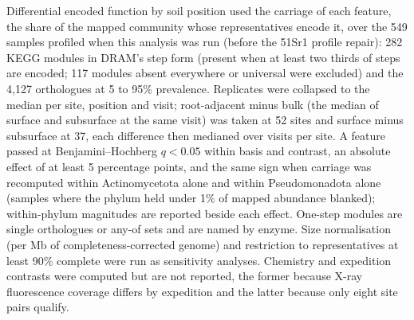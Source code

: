Differential encoded function by soil position used the carriage of each feature, the share of the
mapped community whose representatives encode it, over the 549 samples profiled when this analysis was run (before the 51Sr1 profile repair): 282 KEGG modules in
DRAM's step form (present when at least two thirds of steps are encoded; 117 modules absent everywhere
or universal were excluded) and the 4{,}127 orthologues at 5 to 95\% prevalence. Replicates were
collapsed to the median per site, position and visit; root-adjacent minus bulk (the median of surface
and subsurface at the same visit) was taken at 52 sites and surface minus subsurface at 37, each
difference then medianed over visits per site. A feature passed at Benjamini--Hochberg $q < 0.05$
within basis and contrast, an absolute effect of at least 5 percentage points, and the same sign when
carriage was recomputed within Actinomycetota alone and within Pseudomonadota alone (samples where
the phylum held under 1\% of mapped abundance blanked); within-phylum magnitudes are reported beside
each effect. One-step modules are single orthologues or any-of sets and are named by enzyme. Size
normalisation (per Mb of completeness-corrected genome) and restriction to representatives at least
90\% complete were run as sensitivity analyses. Chemistry and expedition contrasts were computed but
are not reported, the former because X-ray fluorescence coverage differs by expedition and the latter
because only eight site pairs qualify.

